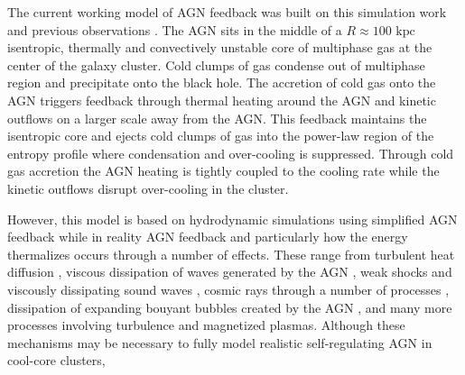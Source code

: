 \documentclass[iop,apjl, twocolappendix]{emulateapj}   %
\begin{document}
The current working model of AGN feedback was built on this simulation work and
previous observations
\cite{voit_global_2017,gaspari_raining_2017,gaspari_unifying_2017}. The AGN
sits in the middle of a $R \approx 100 \text{ kpc}$ isentropic, thermally and
convectively unstable core of multiphase gas at the center of the galaxy
cluster. Cold clumps of gas condense out of multiphase region and precipitate
onto the black hole. The accretion of cold gas onto the AGN triggers feedback
through thermal heating around the AGN and kinetic outflows on a larger scale
away from the AGN. This feedback maintains the isentropic core and ejects cold
clumps of gas into the power-law region of the entropy profile where
condensation and over-cooling is suppressed. Through cold gas accretion the AGN
heating is tightly coupled to the cooling rate while the kinetic outflows
disrupt over-cooling in the cluster.

However, this model is based on hydrodynamic simulations using simplified AGN
feedback while in reality AGN feedback and particularly how the energy
thermalizes occurs through a number of effects.
These range from 
turbulent heat diffusion \cite{ruszkowski_galaxy_2011},
viscous dissipation of waves generated by the AGN \cite{ruszkowski_cluster_2004},
weak shocks and viscously dissipating sound waves \cite{fabian_deep_2003,fabian_viscosity_2005},
cosmic rays through a number of processes \cite{guo_feedback_2008,ruszkowski_global_2017},
dissipation of expanding bouyant bubbles created by the AGN \cite{churazov_evolution_2001-2},
and many more  processes involving turbulence and magnetized plasmas. Although
these mechanisms may be necessary to fully model realistic self-regulating AGN
in cool-core clusters,

\end{document}
